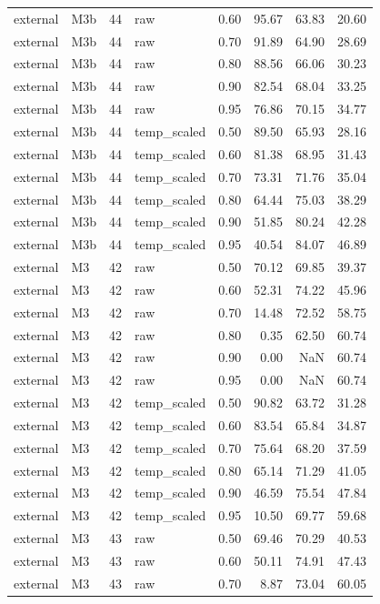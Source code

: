 \begin{tabular}{llrlrrrr}
external & M3b & 44 & raw & 0.60 & 95.67 & 63.83 & 20.60 \\
external & M3b & 44 & raw & 0.70 & 91.89 & 64.90 & 28.69 \\
external & M3b & 44 & raw & 0.80 & 88.56 & 66.06 & 30.23 \\
external & M3b & 44 & raw & 0.90 & 82.54 & 68.04 & 33.25 \\
external & M3b & 44 & raw & 0.95 & 76.86 & 70.15 & 34.77 \\
external & M3b & 44 & temp\_scaled & 0.50 & 89.50 & 65.93 & 28.16 \\
external & M3b & 44 & temp\_scaled & 0.60 & 81.38 & 68.95 & 31.43 \\
external & M3b & 44 & temp\_scaled & 0.70 & 73.31 & 71.76 & 35.04 \\
external & M3b & 44 & temp\_scaled & 0.80 & 64.44 & 75.03 & 38.29 \\
external & M3b & 44 & temp\_scaled & 0.90 & 51.85 & 80.24 & 42.28 \\
external & M3b & 44 & temp\_scaled & 0.95 & 40.54 & 84.07 & 46.89 \\
external & M3 & 42 & raw & 0.50 & 70.12 & 69.85 & 39.37 \\
external & M3 & 42 & raw & 0.60 & 52.31 & 74.22 & 45.96 \\
external & M3 & 42 & raw & 0.70 & 14.48 & 72.52 & 58.75 \\
external & M3 & 42 & raw & 0.80 & 0.35 & 62.50 & 60.74 \\
external & M3 & 42 & raw & 0.90 & 0.00 & NaN & 60.74 \\
external & M3 & 42 & raw & 0.95 & 0.00 & NaN & 60.74 \\
external & M3 & 42 & temp\_scaled & 0.50 & 90.82 & 63.72 & 31.28 \\
external & M3 & 42 & temp\_scaled & 0.60 & 83.54 & 65.84 & 34.87 \\
external & M3 & 42 & temp\_scaled & 0.70 & 75.64 & 68.20 & 37.59 \\
external & M3 & 42 & temp\_scaled & 0.80 & 65.14 & 71.29 & 41.05 \\
external & M3 & 42 & temp\_scaled & 0.90 & 46.59 & 75.54 & 47.84 \\
external & M3 & 42 & temp\_scaled & 0.95 & 10.50 & 69.77 & 59.68 \\
external & M3 & 43 & raw & 0.50 & 69.46 & 70.29 & 40.53 \\
external & M3 & 43 & raw & 0.60 & 50.11 & 74.91 & 47.43 \\
external & M3 & 43 & raw & 0.70 & 8.87 & 73.04 & 60.05 \\

\end{tabular}
